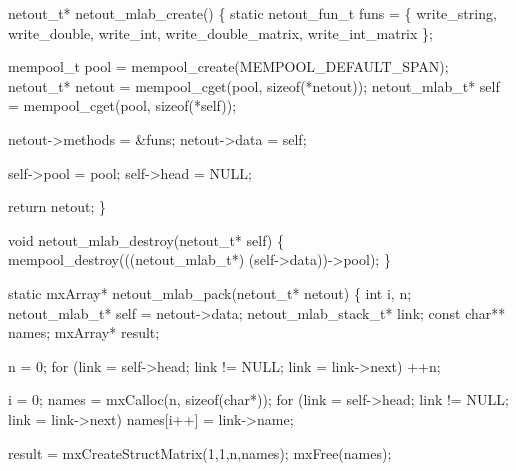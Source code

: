\nwendcode{}\nwdocspar

\nwenddocs{}\endmoddef
netout_t* netout_mlab_create()
\{
    static netout_fun_t funs = \{
        write_string, write_double, write_int,
        write_double_matrix, write_int_matrix
    \};

    mempool_t      pool   = mempool_create(MEMPOOL_DEFAULT_SPAN);
    netout_t*      netout = mempool_cget(pool, sizeof(*netout));
    netout_mlab_t* self   = mempool_cget(pool, sizeof(*self));

    netout->methods = &funs;
    netout->data    = self;

    self->pool  = pool;
    self->head  = NULL;

    return netout;
\}

\nwendcode{}\nwdocspar

\nwenddocs{}\plusendmoddef
void netout_mlab_destroy(netout_t* self)
\{
    mempool_destroy(((netout_mlab_t*) (self->data))->pool);
\}

\nwendcode{}\nwdocspar

\nwenddocs{}\endmoddef
static mxArray* netout_mlab_pack(netout_t* netout)
\{
    int i, n;
    netout_mlab_t*       self = netout->data;
    netout_mlab_stack_t* link;
    const char**         names;
    mxArray*             result;

    n = 0;
    for (link = self->head; link != NULL; link = link->next)
        ++n;

    i = 0;
    names = mxCalloc(n, sizeof(char*));
    for (link = self->head; link != NULL; link = link->next)
        names[i++] = link->name;

    result = mxCreateStructMatrix(1,1,n,names);
    mxFree(names);

